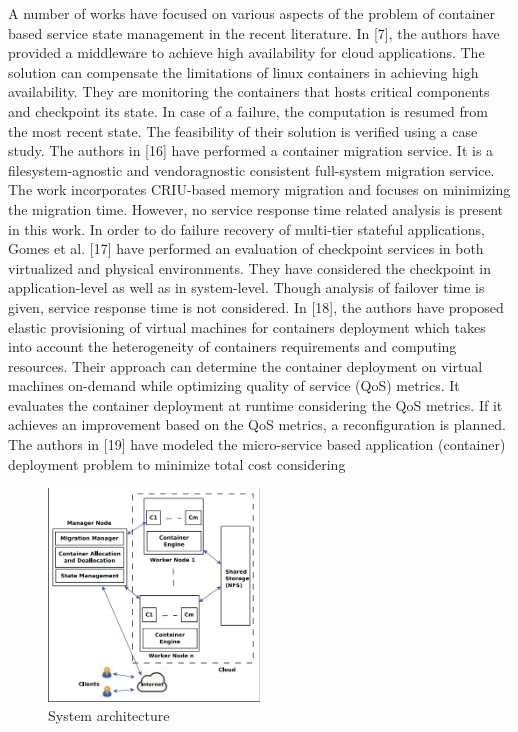 \documentclass[conference]{IEEEtran}
\begin{document}

A number of works have focused on various aspects of the
problem of container based service state management in the
recent literature. In [7], the authors have provided a middleware to achieve high availability for cloud applications. The
solution can compensate the limitations of linux containers in
achieving high availability. They are monitoring the containers
that hosts critical components and checkpoint its state. In
case of a failure, the computation is resumed from the most
recent state. The feasibility of their solution is verified using a
case study. The authors in [16] have performed a container
migration service. It is a filesystem-agnostic and vendoragnostic consistent full-system migration service. The work
incorporates CRIU-based memory migration and focuses on
minimizing the migration time. However, no service response
time related analysis is present in this work. In order to do
failure recovery of multi-tier stateful applications, Gomes et
al. [17] have performed an evaluation of checkpoint services
in both virtualized and physical environments. They have
considered the checkpoint in application-level as well as in
system-level. Though analysis of failover time is given, service
response time is not considered. In [18], the authors have proposed elastic provisioning of virtual machines for containers
deployment which takes into account the heterogeneity of containers requirements and computing resources. Their approach
can determine the container deployment on virtual machines
on-demand while optimizing quality of service (QoS) metrics.
It evaluates the container deployment at runtime considering
the QoS metrics. If it achieves an improvement based on the
QoS metrics, a reconfiguration is planned. The authors in
[19] have modeled the micro-service based application (container) deployment problem to minimize total cost considering
\begin{figure}[htbp]
\centerline{\includegraphics[width=0.5\textwidth]{System design}}
\caption{System architecture}
\label{fig}
\end{figure}
\end{document}
